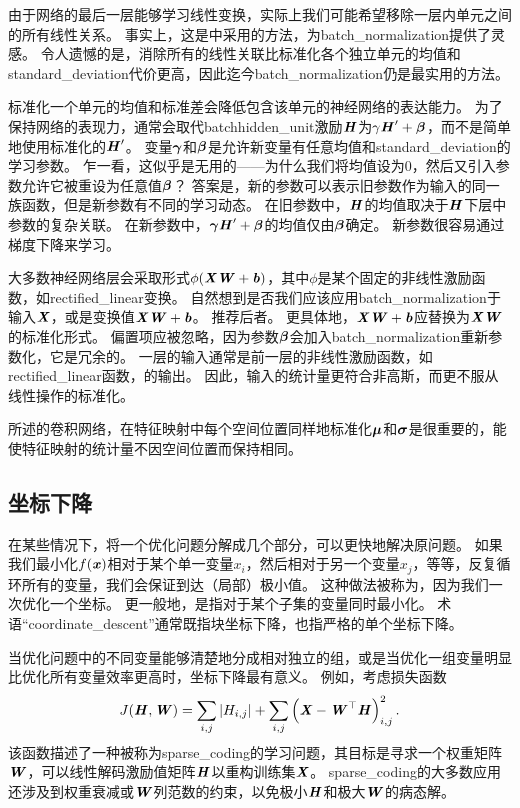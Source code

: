 由于网络的最后一层能够学习线性变换，实际上我们可能希望移除一层内单元之间的所有线性关系。
事实上，这是\cite{Desjardins2015}中采用的方法，为\gls{batch_normalization}提供了灵感。
令人遗憾的是，消除所有的线性关联比标准化各个独立单元的均值和\gls{standard_deviation}代价更高，因此迄今\gls{batch_normalization}仍是最实用的方法。


标准化一个单元的均值和标准差会降低包含该单元的神经网络的表达能力。
为了保持网络的表现力，通常会取代\gls{batch}\gls{hidden_unit}激励$\boldsymbol{\mathit{H}}$为$\gamma \boldsymbol{\mathit{H}}' + \boldsymbol{\beta}$，而不是简单地使用标准化的$\boldsymbol{\mathit{H}}'$。
变量$\boldsymbol{\gamma}$和$\boldsymbol{\beta}$是允许新变量有任意均值和\gls{standard_deviation}的学习参数。
乍一看，这似乎是无用的——为什么我们将均值设为$0$，然后又引入参数允许它被重设为任意值$\boldsymbol{\beta}$？
答案是，新的参数可以表示旧参数作为输入的同一族函数，但是新参数有不同的学习动态。
在旧参数中，$\boldsymbol{\mathit{H}}$的均值取决于$\boldsymbol{\mathit{H}}$下层中参数的复杂关联。
在新参数中，$\boldsymbol{\gamma} \boldsymbol{\mathit{H}}' + \boldsymbol{\beta}$的均值仅由$\boldsymbol{\beta}$确定。
新参数很容易通过梯度下降来学习。

大多数神经网络层会采取形式$\phi(\boldsymbol{\mathit{X}}\boldsymbol{\mathit{W}}+ \boldsymbol{\mathit{b}})$，其中$\phi$是某个固定的非线性激励函数，如\gls{rectified_linear}变换。
自然想到是否我们应该应用\gls{batch_normalization}于输入$\boldsymbol{\mathit{X}}$，或是变换值$\boldsymbol{\mathit{X}}\boldsymbol{\mathit{W}}+\boldsymbol{\mathit{b}}$。
\cite{Ioffe+Szegedy-2015}推荐后者。
更具体地，$\boldsymbol{\mathit{X}}\boldsymbol{\mathit{W}}+\boldsymbol{\mathit{b}}$应替换为$\boldsymbol{\mathit{X}}\boldsymbol{\mathit{W}}$的标准化形式。
偏置项应被忽略，因为参数$\boldsymbol{\beta}$会加入\gls{batch_normalization}重新参数化，它是冗余的。
一层的输入通常是前一层的非线性激励函数，如\gls{rectified_linear}函数，的输出。
因此，输入的统计量更符合非高斯，而更不服从线性操作的标准化。

所述的卷积网络，在特征映射中每个空间位置同样地标准化$\boldsymbol{\mu}$和$\boldsymbol{\sigma}$是很重要的，能使特征映射的统计量不因空间位置而保持相同。

\subsection{坐标下降}
\label{sec:coordinate_descent}
在某些情况下，将一个优化问题分解成几个部分，可以更快地解决原问题。
如果我们最小化$f(\boldsymbol{\mathit{x}})$相对于某个单一变量$x_i$，然后相对于另一个变量$x_j$，等等，反复循环所有的变量，我们会保证到达（局部）极小值。
这种做法被称为，因为我们一次优化一个坐标。
更一般地，是指对于某个子集的变量同时最小化。
术语``\gls{coordinate_descent}''通常既指块坐标下降，也指严格的单个坐标下降。


当优化问题中的不同变量能够清楚地分成相对独立的组，或是当优化一组变量明显比优化所有变量效率更高时，坐标下降最有意义。
例如，考虑损失函数
\begin{equation}
    J(\boldsymbol{\mathit{H}}, \boldsymbol{\mathit{W}}) = \sum_{i,j} |H_{i,j}| + \sum_{i,j} \left( \boldsymbol{\mathit{X}} - \boldsymbol{\mathit{W}}^\top \boldsymbol{\mathit{H}} \right)_{i,j}^2 .
\end{equation}
该函数描述了一种被称为\gls{sparse_coding}的学习问题，其目标是寻求一个权重矩阵$\boldsymbol{\mathit{W}}$，可以线性解码激励值矩阵$\boldsymbol{\mathit{H}}$以重构训练集$\boldsymbol{\mathit{X}}$。
\gls{sparse_coding}的大多数应用还涉及到权重衰减或$\boldsymbol{\mathit{W}}$列范数的约束，以免极小$\boldsymbol{\mathit{H}}$和极大$\boldsymbol{\mathit{W}}$的病态解。

